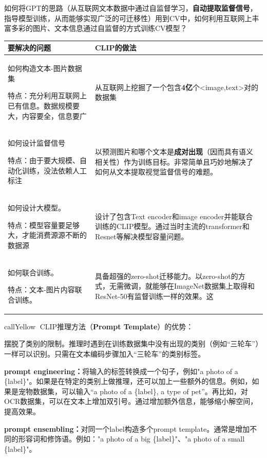 \documentclass[zihao=false,fontset=windows]{ctexart}
\begin{document}
如何将GPT的思路（\textcolor{feishuBlue}{从互联网文本数据中通过自监督学习，}\textcolor{feishuBlue}{\textbf{自动提取监督信号}}\textcolor{feishuBlue}{，指导模型训练，从而能够实现广泛的可迁移性}）用到CV中，如何利用互联网上丰富多彩的图片、文本信息通过自监督的方式训练CV模型？\par
\begin{center}
\renewcommand{\arraystretch}{1.35}
\begin{tabularx}{\textwidth}{|>{\raggedright\arraybackslash}X|>{\raggedright\arraybackslash}X|}
\hline
\cellcolor{callYellow}\centering\arraybackslash \textcolor{feishuRed}{要解决的问题} & \cellcolor{cellLilac}\centering\arraybackslash \textcolor{feishuRed}{CLIP的做法} \\ \hline
\cellcolor{callGreen}如何构造文本-图片数据集\par 特点：充分利用互联网上已有信息。数据规模要大，内容要全，信息要广 & \cellcolor{callBlue}从互联网上挖掘了一个包含\textbf{4亿}个<image,text>对的数据集 \\ \hline
\cellcolor{callGreen}如何设计监督信号\par 特点：由于要大规模、自动化训练，没法依赖人工标注 & \cellcolor{callBlue}以预测图片和哪个文本是\textbf{成对出现}（因而具有语义相关性）作为训练目标。非常简单且巧妙地解决了如何从文本提取视觉监督信号的难题。 \\ \hline
\cellcolor{callGreen}如何设计大模型。\par 特点：模型容量要足够大，才能消费源源不断的数据源 & \cellcolor{callBlue}设计了包含Text encoder和image encoder并能联合训练的CLIP模型。通过当时主流的transformer和Resnet等解决模型容量问题。 \\ \hline
\cellcolor{callGreen}如何联合训练。\par 特点：文本-图片内容联合训练。 & \cellcolor{callBlue}具备超强的zero-shot迁移能力。以zero-shot的方式，无需微调，就能够在ImageNet数据集上取得和ResNet-50有监督训练一样的效果。这 \\ \hline
\end{tabularx}
\end{center}
\begin{feishubox}{callYellow}{🌟}
CLIP推理方法（\textbf{Prompt Template}）的优势：\par
摆脱了类别的限制。推理时遇到在训练数据集中没有出现的类别（例如“三轮车”）一样可以识别。只需在文本编码步骤加入“三轮车”的类别标签。\par
\textbf{prompt engineering：}将输入的标签转换成一个句子，例如"a photo of a \{label\}"。如果是在特定的类别上做推理，还可以加上一些额外的信息。例如，如果是宠物数据集，可以输入“a photo of a \{label\}, a type of pet”。再比如，对OCR数据集，可以在文本上增加双引号。通过增加额外信息，能够缩小解空间，提高效果。\par
\textbf{prompt ensembling：}对同一个label构造多个prompt template。通常是增加不同的形容词和修饰语。例如："a photo of a big \{label\}"、"a photo of a small \{label\}"。\par
\end{feishubox}
\end{document}
